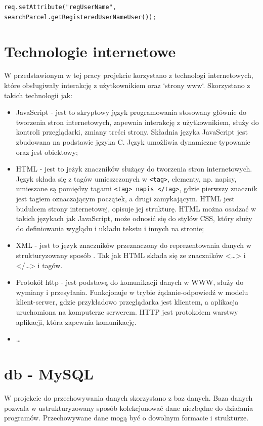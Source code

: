 \documentclass[eng,printmode,oneside]{mgr}
\begin{document}
\texttt{req.setAttribute("regUserName",
						searchParcel.getRegisteredUserNameUser());}

\section{Technologie internetowe}

W przedstawionym w tej pracy projekcie korzystano z technologi internetowych,
które obsługiwały interakcję z użytkownikiem oraz `strony www`. Skorzystano
z takich technologii jak:
\begin{itemize}
  \item JavaScript - jest to skryptowy język programowania stosowany głównie do
  tworzenia stron internetowych, zapewnia interakcję z
  użytkownikiem\cite{javascript.wiki}, służy do kontroli przeglądarki, zmiany
  treści strony. Składnia języka JavaScript jest zbudowana na podstawie języka
  C. Język umożliwia dynamiczne typowanie oraz jest obiektowy;
  \item HTML - jest to jeżyk znaczników służący do tworzenia stron
  internetowych. Język składa się z tagów umieszczonych w \texttt{<tag>},
  elementy, np. napisy, umieszane są pomiędzy tagami \texttt{<tag> napis
  </tag>}, gdzie pierwszy znacznik jest tagiem oznaczającym początek, a drugi
  zamykającym. HTML jest budulcem strony internetowej, opisuje jej strukturę.
  HTML można osadzać w takich językach jak JavaScript, może odnosić się do
  stylów CSS, który służy do definiowania wyglądu i układu tekstu i innych na
  stronie;
  \item XML - jest to język znaczników przeznaczony do reprezentowania danych w
  strukturyzowany sposób \cite{xml.wiki}. Tak jak HTML składa się ze znaczników
  <\ldots> i </\ldots> i tagów.
  \item Protokół http - jest podstawą do komunikacji danych w WWW, służy do
  wymiany i przesyłania. Funkcjonuje w trybie żądanie-odpowiedź w
  modelu klient-serwer, gdzie przykładowo przeglądarka jest klientem, a
  aplikacja uruchomiona na komputerze serwerem. HTTP jest protokołem warstwy
  aplikacji, która zapewnia komunikację.
  \item \ldots
\end{itemize}
\section{db - MySQL}

W projekcie do przechowywania danych skorzystano z baz danych. Baza danych
pozwala w ustrukturyzowany sposób kolekcjonować dane niezbędne do działania
programów. Przechowywane dane mogą być o dowolnym formacie i strukturze.
\end{document}
